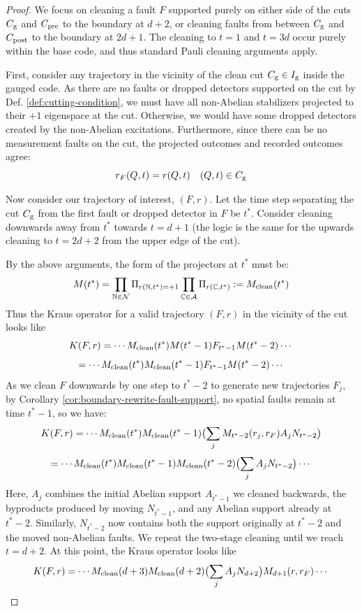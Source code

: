 \documentclass[11pt]{article}
\begin{document}
\begin{proof}

    We focus on cleaning a fault $F$ supported purely on either side of the cuts $C_{\rm g}$ and $C_{\rm pre}$ to the boundary at $d+2$, or cleaning faults from between $C_{\rm g}$ and $C_{\rm post}$ to the boundary at $2d+1$. The cleaning to $t=1$ and $t=3d$ occur purely within the base code, and thus standard Pauli cleaning arguments apply. 

    First, consider any trajectory in the vicinity of the clean cut $C_{\rm g} \in I_{\rm g}$ inside the gauged code. As there are no faults or dropped detectors supported on the cut by Def. \ref{def:cutting-condition}, we must have all non-Abelian stabilizers projected to their $+1$ eigenspace at the cut. Otherwise, we would have some dropped detectors created by the non-Abelian excitations. Furthermore, since there can be no measurement faults on the cut, the projected outcomes and recorded outcomes agree:
    \[
    r_F(Q, t) = r(Q, t) \quad (Q, t) \in C_{\rm g}
    \]

    Now consider our trajectory of interest, $(F, r)$. Let the time step separating the cut $C_{\rm g}$ from the first fault or dropped detector in $F$ be $t^*$. Consider cleaning downwards away from $t^*$ towards $t = d+1$ (the logic is the same for the upwards cleaning to $t = 2d+2$ from the upper edge of the cut). 

    By the above arguments, the form of the projectors at $t^*$ must be:
    \[
    M(t^*) = \prod_{\mathbb{N} \in \mathcal{N}} \Pi_{r(\mathbb{N}, t^*) = +1} \prod_{\mathbb{C} \in \mathcal{A}} \Pi_{r(\mathbb{C}, t^*)} := M_{\rm clean}(t^*)
    \]
    Thus the Kraus operator for a valid trajectory $(F, r)$ in the vicinity of the cut looks like 
    \[
    K(F, r) = \cdots M_{\rm clean}(t^*) M(t^* - 1) F_{t^*-1} M(t^*-2) \cdots 
    \]
    \[
    = \cdots  M_{\rm clean}(t^*) M_{\rm clean}(t^* - 1) F_{t^*-1} M(t^*-2) \cdots 
    \]
    As we clean $F$ downwards by one step to $t^*-2$ to generate new trajectories $F_j$, by Corollary \ref{cor:boundary-rewrite-fault-support}, no spatial faults remain at time $t^*-1$, so we have:
    \[
    K(F, r) = \cdots  M_{\rm clean}(t^*) M_{\rm clean}(t^* - 1) \bigl ( \sum_j M_{t^* - 2}(r_j, r_F) A_j N_{t^*-2}  \bigr )
    \]
    \[
    = \cdots  M_{\rm clean}(t^*) M_{\rm clean}(t^* - 1) M_{\rm clean}(t^* - 2) \bigl ( \sum_j A_j N_{t^*-2} \bigr ) \cdots 
    \]
    Here, $A_j$ combines the initial Abelian support $A_{t^*-1}$ we cleaned backwards, the byproducts produced by moving $N_{t^*-1}$, and any Abelian support already at $t^*-2$. Similarly, $N_{t^*-2}$ now contains both the support originally at $t^*-2$ and the moved non-Abelian faults. We repeat the two-stage cleaning until we reach $t=d+2$. At this point, the Kraus operator looks like
    \[
    K(F, r) = \cdots M_{\rm clean}(d+3) M_{\rm clean}(d+2) \bigl ( \sum_j A_j N_{d+2} \bigr ) M_{d+1}(r, r_F) \cdots 
    \]


\end{proof}
\end{document}
